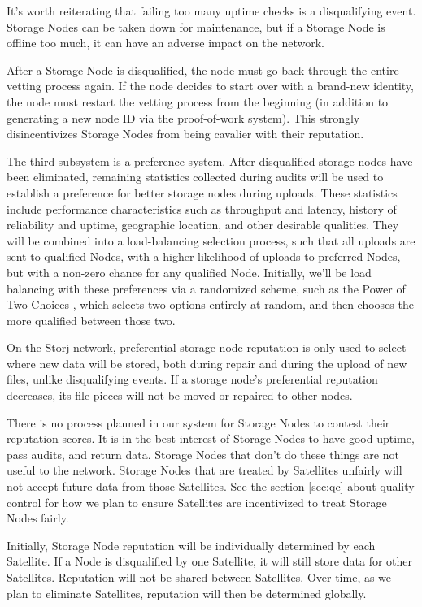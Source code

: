 \documentclass[8pt,fleqn,openany]{book}
\begin{document}
It's worth reiterating that failing too many uptime checks is a disqualifying
event. Storage Nodes can be taken down for maintenance, but if a Storage Node
is offline too much, it can have an adverse impact on the network.

After a Storage Node is disqualified, the node must go back through the entire
vetting process again. If the node decides to start over with a brand-new
identity, the node must restart the vetting process from the beginning (in
addition to generating a new node ID via the proof-of-work system). This
strongly disincentivizes Storage Nodes from being cavalier with their
reputation.

The third subsystem is a preference system. After disqualified storage nodes
have been eliminated, remaining statistics collected during audits
will be used to establish a preference for better storage nodes during uploads.
These statistics include performance characteristics such as throughput and
latency, history of reliability and uptime, geographic location, and other
desirable qualities.
They will be combined into a load-balancing selection process, such
that all uploads are sent to qualified Nodes, with a higher likelihood of
uploads to preferred Nodes, but with a non-zero chance for any qualified Node.
Initially, we'll be load balancing with these preferences via a randomized
scheme, such as the Power of Two Choices \cite{power-of-two-choices}, which
selects two options entirely at random, and then chooses the more qualified
between those two.

On the Storj network, preferential storage node reputation is only used to
select where new data will be stored, both during repair and during the
upload of new files, unlike disqualifying events.
If a storage node's preferential reputation decreases, its file pieces will not
be moved or repaired to other nodes.

There is no process planned in our system for Storage Nodes to contest their
reputation scores. It is in the best interest of Storage Nodes to have good
uptime, pass audits, and return data. Storage Nodes that don't do these things
are not useful to the network. Storage Nodes that are treated by Satellites
unfairly will not accept future data from those Satellites. See the section
\ref{sec:qc} about quality control for how we plan to ensure Satellites are
incentivized to treat Storage Nodes fairly.

Initially, Storage Node reputation will be individually determined by each
Satellite. If a Node is disqualified by one Satellite, it will still
store data for other Satellites. Reputation will not be shared between
Satellites. Over time, as we plan to eliminate Satellites,
reputation will then be determined globally.
\end{document}
